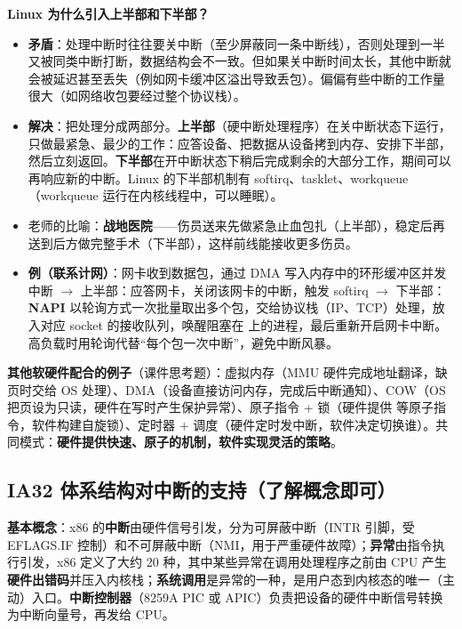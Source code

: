 \textbf{Linux 为什么引入上半部和下半部？}
\begin{itemize}
    \item \textbf{矛盾}：处理中断时往往要关中断（至少屏蔽同一条中断线），否则处理到一半又被同类中断打断，数据结构会不一致。但如果关中断时间太长，其他中断就会被延迟甚至丢失（例如网卡缓冲区溢出导致丢包）。偏偏有些中断的工作量很大（如网络收包要经过整个协议栈）。
    \item \textbf{解决}：把处理分成两部分。\textbf{上半部}（硬中断处理程序）在关中断状态下运行，只做最紧急、最少的工作：应答设备、把数据从设备拷到内存、安排下半部，然后立刻返回。\textbf{下半部}在开中断状态下稍后完成剩余的大部分工作，期间可以再响应新的中断。Linux 的下半部机制有 softirq、tasklet、workqueue（workqueue 运行在内核线程中，可以睡眠）。
    \item 老师的比喻：\textbf{战地医院}——伤员送来先做紧急止血包扎（上半部），稳定后再送到后方做完整手术（下半部），这样前线能接收更多伤员。
    \item \textbf{例（联系计网）}：网卡收到数据包，通过 DMA 写入内存中的环形缓冲区并发中断 $\to$ 上半部：应答网卡，关闭该网卡的中断，触发  softirq $\to$ 下半部：\textbf{NAPI} 以轮询方式一次批量取出多个包，交给协议栈（IP、TCP）处理，放入对应 socket 的接收队列，唤醒阻塞在  上的进程，最后重新开启网卡中断。高负载时用轮询代替“每个包一次中断”，避免中断风暴。
\end{itemize}

\textbf{其他软硬件配合的例子}（课件思考题）：虚拟内存（MMU 硬件完成地址翻译，缺页时交给 OS 处理）、DMA（设备直接访问内存，完成后中断通知）、COW（OS 把页设为只读，硬件在写时产生保护异常）、原子指令 + 锁（硬件提供  等原子指令，软件构建自旋锁）、定时器 + 调度（硬件定时发中断，软件决定切换谁）。共同模式：\textbf{硬件提供快速、原子的机制，软件实现灵活的策略}。

\subsection{IA32 体系结构对中断的支持（了解概念即可）}

\textbf{基本概念}：x86 的\textbf{中断}由硬件信号引发，分为可屏蔽中断（INTR 引脚，受 EFLAGS.IF 控制）和不可屏蔽中断（NMI，用于严重硬件故障）；\textbf{异常}由指令执行引发，x86 定义了大约 20 种，其中某些异常在调用处理程序之前由 CPU 产生\textbf{硬件出错码}并压入内核栈；\textbf{系统调用}是异常的一种，是用户态到内核态的唯一（主动）入口。\textbf{中断控制器}（8259A PIC 或 APIC）负责把设备的硬件中断信号转换为中断向量号，再发给 CPU。

